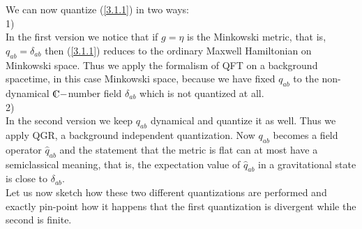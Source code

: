 \documentclass[12pt]{report}
\def\Cl{{\mathchoice
{\setbox0=\hbox{$\displaystyle\rm C$}\hbox{\hbox to0pt
{\kern0.4\wd0\vrule height0.9\ht0\hss}\box0}}
{\setbox0=\hbox{$\textstyle\rm C$}\hbox{\hbox to0pt
{\kern0.4\wd0\vrule height0.9\ht0\hss}\box0}}
{\setbox0=\hbox{$\scriptstyle\rm C$}\hbox{\hbox to0pt
{\kern0.4\wd0\vrule height0.9\ht0\hss}\box0}}
{\setbox0=\hbox{$\scriptscriptstyle\rm C$}\hbox{\hbox to0pt
{\kern0.4\wd0\vrule height0.9\ht0\hss}\box0}}}}
\begin{document}
We can now quantize (\ref{3.1.1}) in two ways: \\
1) \\
In the first version we notice that if $g=\eta$ is the Minkowski metric,
that is, $q_{ab}=\delta_{ab}$ then (\ref{3.1.1}) reduces to the 
ordinary Maxwell Hamiltonian on Minkowski space. Thus we apply the 
formalism of QFT on a background spacetime, in this case 
Minkowski space, because we have fixed $q_{ab}$ to the non-dynamical 
$\Cl-$number field $\delta_{ab}$ which is not quantized at all. \\
2)\\
In the second version we keep $q_{ab}$ dynamical and quantize it as well.
Thus we apply QGR, a background independent quantization. Now $q_{ab}$
becomes a field operator $\hat{q}_{ab}$ and the statement that the metric 
is flat can at most have a semiclassical meaning, that is, the expectation 
value of $\hat{q}_{ab}$ in a gravitational state is close to 
$\delta_{ab}$.\\
Let us now sketch how these two different quantizations are performed and 
exactly pin-point how it happens that the first quantization is 
divergent while the second is finite.
%
\end{document}
